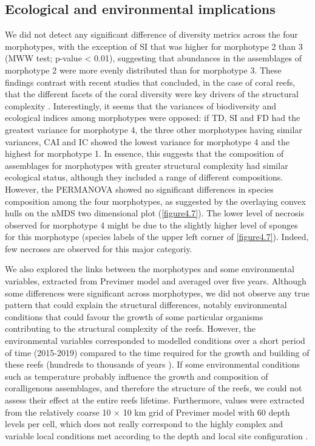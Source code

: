 \subsection{Ecological and environmental implications}\label{chapitre4_4.2}
We did not detect any significant difference of diversity metrics across the four morphotypes, with the exception of SI that was higher for morphotype 2 than 3 (MWW test; p-value < 0.01), suggesting that abundances in the assemblages of morphotype 2 were more evenly distributed than for morphotype 3. These findings contrast with recent studies that concluded, in the case of coral reefs, that the different facets of the coral diversity were key drivers of the structural complexity \citep{darling_relationships_2017, price_using_2019}. Interestingly, it seems that the variances of biodiversity and ecological indices among morphotypes were opposed: if TD, SI and FD had the greatest variance for morphotype 4, the three other morphotypes having similar variances, CAI and IC showed the lowest variance for morphotype 4 and the highest for morphotype 1. In essence, this suggests that the composition of assemblages for morphotypes with greater structural complexity had similar ecological status, although they included a range of different compositions. However, the PERMANOVA showed no significant differences in species composition among the four morphotypes, as suggested by the overlaying convex hulls on the nMDS two dimensional plot (\autoref{figure4.7}). The lower level of necrosis observed for morphotype 4 might be due to the slightly higher level of sponges for this morphotype (species labels of the upper left corner of \autoref{figure4.7}). Indeed, few necroses are observed for this major categoriy.

We also explored the links between the morphotypes and some environmental variables, extracted from Previmer model and averaged over five years. Although some differences were significant across morphotypes, we did not observe any true pattern that could explain the structural differences, notably environmental conditions that could favour the growth of some particular organisms contributing to the structural complexity of the reefs. However, the environmental variables corresponded to modelled conditions over a short period of time (2015-2019) compared to the time required for the growth and building of these reefs (hundreds to thousands of years \citep{sartoretto_age_1996}). If some environmental conditions such as temperature probably influence the growth and composition of coralligenous assemblages, and therefore the structure of the reefs, we could not assess their effect at the entire reefs lifetime. Furthermore, values were extracted from the relatively coarse 10 $\times$ 10 km grid of Previmer model with 60 depth levels per cell, which does not really correspond to the highly complex and variable local conditions met according to the depth and local site configuration \citep{kipson_rapid_2011, willis_habitat_2005}.

